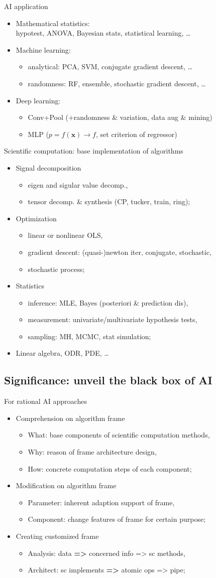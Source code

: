 \documentclass[11pt]{beamer}
\newcommand{\asred}[1]{{\color{red}#1}}
\newcommand{\uniitem}[1]{\begin{itemize}\item #1 \end{itemize}}
\begin{document}
\begin{frame}{AI application}
	\begin{itemize}
		\item Mathematical statistics: \\
			\qquad hypotest, ANOVA, Bayesian stats, statistical learning, \dots
		\item Machine learning: \\
			\begin{itemize}
				\item analytical: PCA, SVM, conjugate gradient descent, \dots
				\item randomness: RF, ensemble, stochastic gradient descent, \dots
			\end{itemize}
		\item Deep learning: \\
			\begin{itemize}
				\item Conv+Pool (+randomness \& variation, data aug \& mining)
				\item MLP ($p = f(\boldsymbol{x}) \rightarrow f$, set criterion of regressor)
			\end{itemize}
	\end{itemize}
\end{frame}

\begin{frame}{Scientific computation: base implementation of algorithms}
	\uniitem{Signal decomposition
		\uniitem{eigen and sigular value decomp.,}
		\uniitem{tensor decomp. \& synthesis (CP, tucker, train, ring);}}
	\uniitem{Optimization
		\uniitem{linear or nonlinear OLS,}
		\uniitem{gradient descent: (quasi-)newton iter, conjugate, stochastic,}
		\uniitem{stochastic process;}}
	\uniitem{Statistics
		\uniitem{inference: MLE, Bayes (posteriori \& prediction dis), }
		\uniitem{measurement: univariate/multivariate hypothesis tests,}
		\uniitem{sampling: MH, MCMC, stat simulation;}}
	\uniitem{Linear algebra, ODR, PDE, \dots}
\end{frame}

\subsection{Significance: unveil the black box of AI}

\begin{frame}{For rational AI approaches}
	\uniitem{Comprehension on algorithm frame
		\uniitem{What: base components of scientific computation methods,}
		\uniitem{Why: reason of frame architecture design,}
		\uniitem{How: concrete computation steps of each component;}}
	\uniitem{Modification on algorithm frame
		\uniitem{Parameter: inherent adaption support of frame,}
		\uniitem{Component: change features of frame for certain purpose;}}
	\uniitem{Creating customized frame
		\uniitem{Analysis: data \asred{\textbf{=>}} concerned info => sc methods,}
		\uniitem{Architect: sc implements \asred{\textbf{=>}} atomic ops => pipe;}}
\end{frame}
\end{document}
